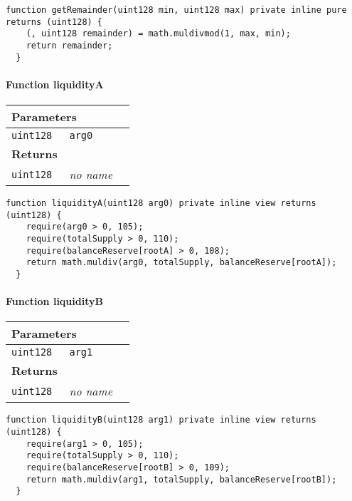 \vspace{2cm}

\begin{lstlisting}[firstnumber=171]
  function getRemainder(uint128 min, uint128 max) private inline pure returns (uint128) {
    (, uint128 remainder) = math.muldivmod(1, max, min);
    return remainder;
  }
\end{lstlisting}

\paragraph{Function liquidityA}


\ifsoltables
\noindent\begin{tabular}{|l|l|p{5cm}|}\hline
\multicolumn{3}{|l|}{\bf Parameters}\\\hline
\tt uint128 & \tt arg0 &\\\hline
\multicolumn{3}{|l|}{\bf Returns}\\\hline
\tt uint128 & {\em no name} &\\\hline
\end{tabular}
\fi

\vspace{2cm}

\begin{lstlisting}[firstnumber=191]
  function liquidityA(uint128 arg0) private inline view returns (uint128) {
    require(arg0 > 0, 105);
    require(totalSupply > 0, 110);
    require(balanceReserve[rootA] > 0, 108);
    return math.muldiv(arg0, totalSupply, balanceReserve[rootA]);
  }
\end{lstlisting}

\paragraph{Function liquidityB}


\ifsoltables
\noindent\begin{tabular}{|l|l|p{5cm}|}\hline
\multicolumn{3}{|l|}{\bf Parameters}\\\hline
\tt uint128 & \tt arg1 &\\\hline
\multicolumn{3}{|l|}{\bf Returns}\\\hline
\tt uint128 & {\em no name} &\\\hline
\end{tabular}
\fi

\vspace{2cm}

\begin{lstlisting}[firstnumber=199]
  function liquidityB(uint128 arg1) private inline view returns (uint128) {
    require(arg1 > 0, 105);
    require(totalSupply > 0, 110);
    require(balanceReserve[rootB] > 0, 109);
    return math.muldiv(arg1, totalSupply, balanceReserve[rootB]);
  }
\end{lstlisting}

